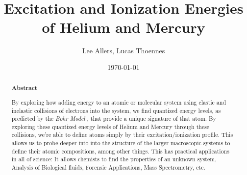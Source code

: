 \documentclass[%
 reprint,
 amsmath,amssymb,
 aps,
]{revtex4-1}
\begin{document}
\newcommand {\gr}{$\gamma-ray$\xspace}
\newcommand {\grs}{$\gamma-rays$\xspace}
\newcommand {\gp}{$\gamma_{\text{photon}}$\xspace}
\newcommand {\cs}{$^{137}$Cesium \xspace}
\newcommand {\ba}{$^{133}$Barium \xspace}
\newcommand {\co}{$^{60}$Cobalt \xspace}
\newcommand {\na}{$^{22}$Sodium \xspace}
\newcommand {\fp}{\textit{findpeaks}\xspace}
\title{Excitation and Ionization Energies of Helium and Mercury}%


\author{Lee Allers, Lucas Thoennes}

\date{\today}%

\begin{abstract}
\begin{center} \textbf{Abstract}\end{center}
By exploring how adding energy to an atomic or molecular system using elastic and inelastic collisions of electrons into the system, we find quantized energy levels, as predicted by the \textit{ Bohr Model} \cite{bohrmodel},  that provide a unique signature of that atom. By exploring these quantized energy levels of Helium and Mercury through these collisions, we're able to define atoms simply by their excitation/ionization profile. This allows us to probe deeper into into the structure of the larger macroscopic systems to define their atomic compositions, among other things. This has practical applications in all of science: It allows chemists to find the properties of an unknown system, Analysis of Biological fluids, Forensic Applications, Mass Spectrometry, etc.
\end{abstract}

\maketitle
\end{document}
